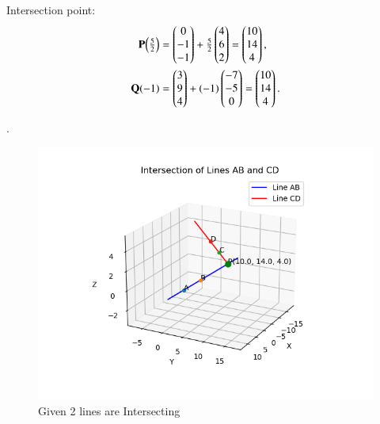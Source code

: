 \documentclass[journal]{IEEEtran}
\begin{document}
Intersection point:
\begin{align}
\mathbf{P}\!\left(\tfrac{5}{2}\right)
&=\begin{pmatrix}0\\-1\\-1\end{pmatrix}+\tfrac{5}{2}\begin{pmatrix}4\\6\\2\end{pmatrix}
=\begin{pmatrix}10\\14\\4\end{pmatrix},\\
\mathbf{Q}(-1)
&=\begin{pmatrix}3\\9\\4\end{pmatrix}+(-1)\begin{pmatrix}-7\\-5\\0\end{pmatrix}
=\begin{pmatrix}10\\14\\4\end{pmatrix}.
\end{align}

.


\begin{figure}[H]
\centering
\includegraphics[width=0.75\columnwidth]{figs/8.png}
\caption{Given 2 lines are Intersecting}
\label{fig:line_eqn}
\end{figure}
\end{document}
